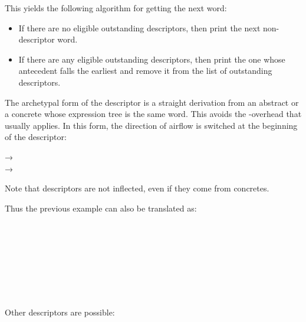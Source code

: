 \documentclass{book}
\begin{document}
This yields the following algorithm for getting the next word:

\begin{itemize}
  \item If there are no eligible outstanding descriptors, then print the next non-descriptor word.
  \item If there are any eligible outstanding descriptors, then print the one whose antecedent falls the earliest and remove it from the list of outstanding descriptors.
\end{itemize}

The archetypal form of the descriptor is a straight derivation from an abstract or a concrete whose expression tree is the same word. This avoids the \hlii{$\ulcorner\lrcorner$}-overhead that usually applies. In this form, the direction of airflow is switched at the beginning of the descriptor:

\begin{center}
    →   \\
    →  
\end{center}

Note that descriptors are not inflected, even if they come from concretes.

Thus the previous example can also be translated as: \\
~\\
 \\
 \\
\hli{$\llcorner$}       \\
~\\
 \\
 \\
      \\

Other descriptors are possible:
\end{document}
